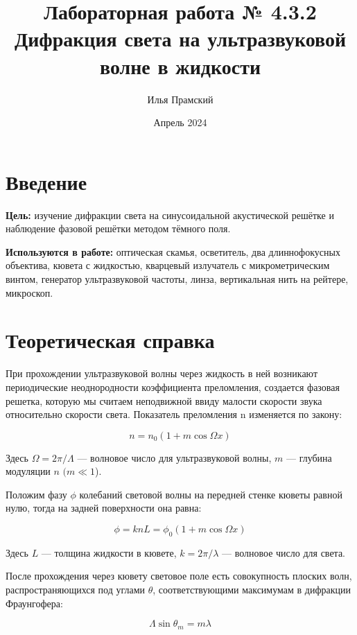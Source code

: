 \documentclass[a4paper,12pt]{article}
\title{Лабораторная работа № 4.3.2\\Дифракция света на ультразвуковой волне в жидкости}
\author{Илья Прамский}
\date{Апрель 2024}
\begin{document}
\maketitle
\newpage
\section*{Введение}
\textbf{Цель:} изучение дифракции света на синусоидальной акустической решётке и наблюдение фазовой решётки методом тёмного
поля.

\textbf{Используются в работе:} оптическая скамья, осветитель, два длиннофокусных объектива, кювета с жидкостью, кварцевый излучатель
с микрометрическим винтом, генератор ультразвуковой частоты, линза, вертикальная нить на рейтере, микроскоп.

\section{Теоретическая справка}
При прохождении ультразвуковой волны через жидкость в ней возникают периодические неоднородности коэффициента преломления, создается фазовая решетка, которую мы считаем неподвижной ввиду малости скорости звука относительно скорости света. Показатель
	преломления n изменяется по закону:
	
	\begin{equation}\label{}
	n = n_0 (1 + m \cos \Omega x)
	\end{equation}
	
	Здесь $ \Omega = 2 \pi / \Lambda $ --- волновое число для ультразвуковой волны, $ m $ --- глубина модуляции $ n $ $ (m \ll 1 $).
	
	Положим фазу $ \phi $ колебаний световой волны на передней стенке кюветы равной нулю, тогда на задней поверхности она равна:
	
	\begin{equation}\label{}
	\phi  = k n L = \phi_0 (1 + m \cos \Omega x)
	\end{equation}
	
	Здесь $ L $ --- толщина жидкости в кювете, $ k = 2 \pi / \lambda $ --- волновое число для света.
	
	После прохождения через кювету световое поле есть совокупность плоских волн, распространяющихся под углами $ \theta $, соответствующими максимумам в дифракции Фраунгофера:
	
\begin{equation}\label{}	
	\Lambda \sin \theta_m = m \lambda
\end{equation}
\end{document}
